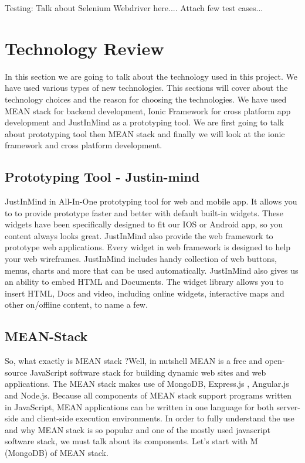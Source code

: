 Testing: Talk about Selenium Webdriver here.... Attach few test cases...


\chapter{Technology Review}
	In this section we are going to talk about the technology used in this project.  We have used various types of new technologies. This sections will cover about the technology choices and the reason for choosing the technologies. We have used MEAN stack for backend development, Ionic Framework for cross platform app development and JustInMind as a prototyping tool.  We are first going to talk about prototyping tool then MEAN stack and finally we will look at the ionic framework and cross platform development. 

	\section{Prototyping Tool - Justin-mind}
	 JustInMind  in All-In-One prototyping tool for web and mobile app. \cite{JustInMind} It allows you to to provide prototype faster and better with default built-in widgets. These widgets have been specifically designed to fit our IOS or Android app, so you content always looks great.  JustInMind also provide the web framework to prototype web applications. Every widget in web framework is designed to help your web wireframes. JustInMind includes handy collection of web buttons, menus, charts  and more that can be used automatically.  JustInMind also gives us an ability to embed HTML and Documents. The widget library allows you to insert HTML, Docs and video, including online widgets, interactive maps and other on/offline content, to name a few. 
	 
	\section{MEAN-Stack}
	So, what exactly is MEAN stack ?Well, in nutshell \cite{Mean-Stack} MEAN is a free and open-source JavaScript software stack for building dynamic web sites and web applications. The MEAN stack makes use of MongoDB, Express.js , Angular.js and Node.js. Because all components of MEAN stack support programs written in JavaScript, MEAN applications can be written in one language for both server-side and  client-side execution environments. In order to fully understand the use and why MEAN stack is so popular and one of the mostly used javascript software stack, we must talk about its components. Let's start with M (MongoDB) of MEAN stack.
	
